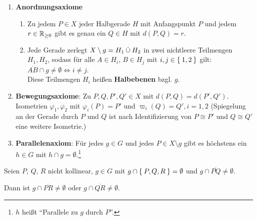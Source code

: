 \begin{definition}
    \begin{enumerate}[label=§\arabic*),ref=§\arabic*,start=3]
        \item \textbf{Anordnungsaxiome}\label{axiom:3}
            \begin{enumerate}[label=(\roman*),ref=§\theenumi{} (\roman*)]
                \item \label{axiom:3.1} Zu jedem $P \in X$ jeder 
                      Halbgerade $H$ mit Anfangspunkt $P$ und jedem 
                      $r \in \mathbb{R}_{\geq 0}$ gibt es genau ein 
                      $Q \in H$ mit $d(P,Q) = r$.
                \item \label{axiom:3.2} Jede Gerade zerlegt 
                      $X \setminus g = H_1 \mathbin{\dot{\cup}} H_2$ in zwei 
                      nichtleere Teilmengen $H_1, H_2$,
                      sodass für alle $A \in H_i$, $B \in H_j$ mit
                      $i,j \in \Set{1,2}$ gilt: 
                      $\overline{AB} \cap g \neq \emptyset \Leftrightarrow i \neq j$.\\
                      Diese Teilmengen $H_i$ heißen 
                      \textbf{Halbebenen} bzgl. 
                      $g$.
            \end{enumerate}
        \item \textbf{Bewegungsaxiome}: Zu $P, Q, P', Q' \in X$\label{axiom:4}
            mit $d(P,Q) = d(P', Q')$. Isometrien $\varphi_1, \varphi_2$
            mit $\varphi_i (P) = P'$ und $\varpi_i(Q) = Q', i=1,2$
            (Spiegelung an der Gerade durch $P$ und $Q$ ist nach 
             Identifizierung von $P \cong P'$ und $Q \cong Q'$ eine
             weitere Isometrie.)
        \item \textbf{Parallelenaxiom}: Für jedes $g \in G$ und jedes
            $P \in X \setminus g$ gibt es höchstens ein $h \in G$ mit
            $h \cap g = \emptyset$.\footnote{$h$ heißt \enquote{Parallele zu $g$ durch $P$}.}
    \end{enumerate}
\end{definition}

\begin{satz}\label{satz:rasch} %
    Seien $P$, $Q$, $R$ nicht kollinear, $g \in G$ mit $g \cap \Set{P, Q, R} = \emptyset$
    und $g \cap \overline{PQ} \neq \emptyset$. 

    Dann ist $g \cap \overline{PR} \neq \emptyset$ oder 
             $g \cap \overline{QR} \neq \emptyset$.
\end{satz}

